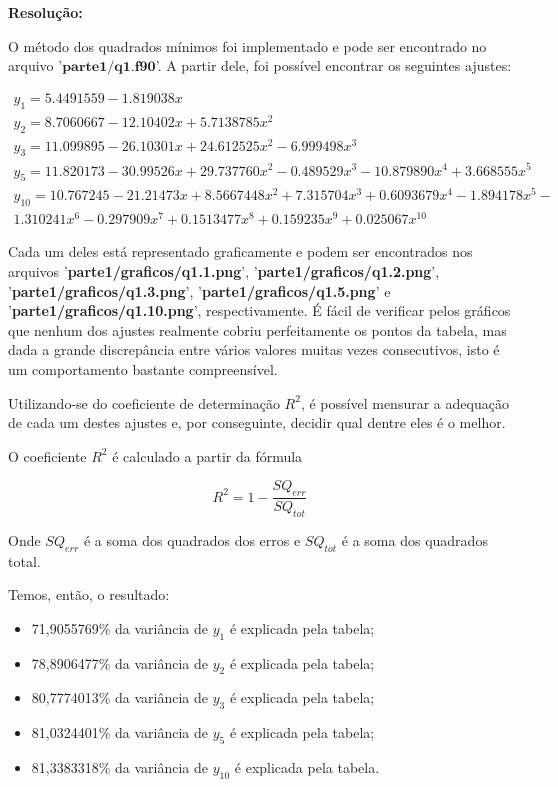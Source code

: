 \documentclass[12pt]{article}
\begin{document}
\textbf{Resolução:}

O método dos quadrados mínimos foi implementado e pode ser encontrado no arquivo '$\textbf{parte1/q1.f90}$'. A partir dele, foi possível encontrar os seguintes ajustes:

\begin{gather*}
    y_{1} = 5.4491559 - 1.819038x \\
    y_{2} = 8.7060667 - 12.10402x + 5.7138785x^{2} \\
    y_{3} = 11.099895 - 26.10301x + 24.612525x^{2} - 6.999498x^{3} \\
    y_{5} = 11.820173 - 30.99526x + 29.737760x^{2} - 0.489529x^{3} - 10.879890x^{4} + 3.668555x^{5} \\
    y_{10} = 10.767245 - 21.21473x + 8.5667448x^{2} + 7.315704x^{3} + 0.6093679x^{4} - 1.894178x^{5} - \\ 1.310241x^{6} - 0.297909x^{7} + 0.1513477x^{8} + 0.159235x^{9} + 0.025067x^{10}
\end{gather*}

Cada um deles está representado graficamente e podem ser encontrados nos arquivos '\textbf{parte1/graficos/q1.1.png}', '\textbf{parte1/graficos/q1.2.png}', '\textbf{parte1/graficos/q1.3.png}', '\textbf{parte1/graficos/q1.5.png}' e '\textbf{parte1/graficos/q1.10.png}', respectivamente.
É fácil de verificar pelos gráficos que nenhum dos ajustes realmente cobriu perfeitamente os pontos da tabela, mas dada a grande discrepância entre vários valores muitas vezes consecutivos, isto é um comportamento bastante compreensível.

Utilizando-se do coeficiente de determinação $R^{2}$, é possível mensurar a adequação de cada um destes ajustes e, por conseguinte, decidir qual dentre eles é o melhor.

O coeficiente $R^{2}$ é calculado a partir da fórmula

\begin{equation}
    R^{2} = 1 - \frac{SQ_{err}}{SQ_{tot}}
\end{equation}

Onde $SQ_{err}$ é a soma dos quadrados dos erros e ${SQ_{tot}}$ é a soma dos quadrados total.

Temos, então, o resultado:

\begin{itemize}[noitemsep]
\item 71,9055769\% da variância de $y_{1}$ é explicada pela tabela;
\item 78,8906477\% da variância de $y_{2}$ é explicada pela tabela;
\item 80,7774013\% da variância de $y_{3}$ é explicada pela tabela;
\item 81,0324401\% da variância de $y_{5}$ é explicada pela tabela;
\item 81,3383318\% da variância de $y_{10}$ é explicada pela tabela.
\end{itemize}
\end{document}
